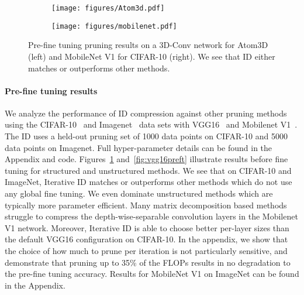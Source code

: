 


\begin{figure}[h]%
\centering
\begin{subfigure}{.49\textwidth}
  \texttt{[image: figures/Atom3d.pdf]} %
\end{subfigure}
\begin{subfigure}{.49\textwidth}
  \texttt{[image: figures/mobilenet.pdf]} %
\end{subfigure}
\caption{Pre-fine tuning pruning results on a 3D-Conv network for Atom3D (left) and MobileNet V1 for CIFAR-10 (right). 
We see that ID either matches or outperforms other methods.}
\label{fig:mobilenet_atom3d}
\end{figure}






\paragraph{Pre-fine tuning results}
We analyze the performance of ID compression against other pruning methods using the CIFAR-10~\cite{datacifar10} and Imagenet~\cite{deng2009imagenet} data sets with VGG16~\cite{simoyan2015vgg} and Mobilenet V1~\cite{MobilenetMainPaper}.  
The ID uses a held-out pruning set of 1000 data points on CIFAR-10 and 5000 data points on Imagenet.
Full hyper-parameter details can be found in the Appendix and code. 
Figures~\ref{fig:mobilenet_atom3d} and~\ref{fig:vgg16preft} illustrate results before fine tuning for structured and unstructured methods.
We see that on CIFAR-10 and ImageNet, Iterative ID matches or outperforms other methods which do not use any global fine tuning.
We even dominate unstructured methods which are typically more parameter efficient.
Many matrix decomposition based methods struggle to compress the depth-wise-separable convolution layers in the Mobilenet V1 network.
Moreover, Iterative ID is able to choose better per-layer sizes than the default VGG16 configuration on CIFAR-10. 
In the appendix, we show that the choice of how much to prune per iteration is not particularly sensitive, and demonstrate that 
pruning up to 35\% of the FLOPs results in no degradation to the pre-fine tuning accuracy.
Results for MobileNet V1 on ImageNet can be found in the Appendix.

